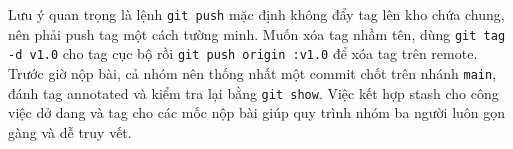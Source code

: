 Lưu ý quan trọng là lệnh \verb|git push| mặc định không đẩy tag lên kho chứa chung, nên phải push tag một cách tường minh.
Muốn xóa tag nhầm tên, dùng \verb|git tag -d v1.0| cho tag cục bộ rồi \verb|git push origin :v1.0| để xóa tag trên remote.
Trước giờ nộp bài, cả nhóm nên thống nhất một commit chốt trên nhánh \verb|main|, đánh tag annotated và kiểm tra lại bằng \verb|git show|.
Việc kết hợp stash cho công việc dở dang và tag cho các mốc nộp bài giúp quy trình nhóm ba người luôn gọn gàng và dễ truy vết.
